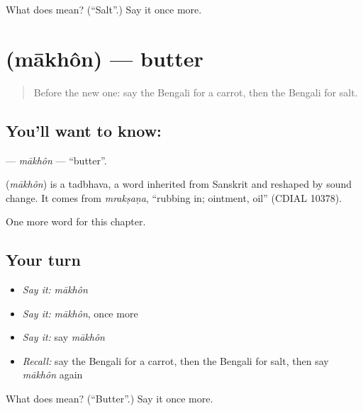 \begin{tcolorbox}[breakable,colback=teal!4,colframe=teal!35!black,title={Before you move on}]
What does  mean? (\textquotedblleft{}Salt\textquotedblright{}.) Say it once more.
\end{tcolorbox}
\section[\texorpdfstring{\bn{মাখন} (mākhôn)}{মাখন (mākhôn)}]{ (mākhôn) — butter}

\label{lesson:BN-C57-makhon}



\begin{quote}
Before the new one: say the Bengali for a carrot, then the Bengali for salt.
\end{quote}

\subsection*{You'll want to know: }
\textbf{} — \emph{mākhôn} — \textquotedblleft{}butter\textquotedblright{}.

\begin{cousinweb}
\textbf{} (\emph{mākhôn}) is a tadbhava, a word inherited from Sanskrit and reshaped by sound change. It comes from \emph{mrakṣaṇa}, \textquotedblleft{}rubbing in; ointment, oil\textquotedblright{} (CDIAL 10378).
\end{cousinweb}

\begin{grammarlens}[title={What you've built}]
One more word for this chapter.
\end{grammarlens}

\subsection*{Your turn}
\begin{itemize}
\raggedright
  \item \emph{Say it:} \emph{mākhôn}
  \item \emph{Say it:} \emph{mākhôn}, once more
  \item \emph{Say it:} say \emph{mākhôn}
  \item \emph{Recall:} say the Bengali for a carrot, then the Bengali for salt, then say \emph{mākhôn} again
\end{itemize}

\begin{tcolorbox}[breakable,colback=teal!4,colframe=teal!35!black,title={Before you move on}]
What does  mean? (\textquotedblleft{}Butter\textquotedblright{}.) Say it once more.
\end{tcolorbox}

